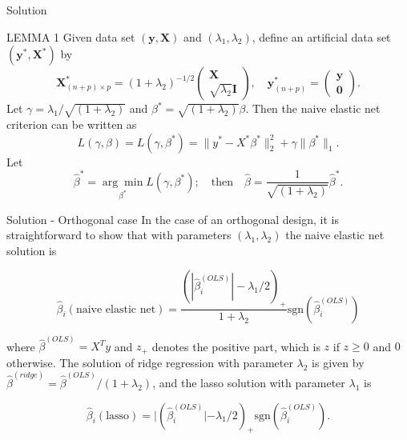     \begin{frame}{Solution}
        \begin{block}{LEMMA 1}
            Given data set $\left(\textbf{y}, \textbf{X}\right)$ and $(\lambda_1, \lambda_2)$, define an artificial data set $\left(\textbf{y}^*, \textbf{X}^*\right)$ by
$$
\mathbf{X}^*_{(n+p) \times p} = (1 + \lambda_2)^{-1/2}
\begin{pmatrix}
\mathbf{X} \\
\sqrt{\lambda_2} \mathbf{I}
\end{pmatrix}, \quad
\mathbf{y}^*_{(n+p)} = \begin{pmatrix}
\mathbf{y} \\
\mathbf{0}
\end{pmatrix}.
$$
Let $\gamma=\lambda_1/\sqrt{(1+\lambda_2)}$ and $\beta^*=\sqrt{(1+\lambda_2)}\beta$. Then the naive elastic net criterion can be written as
$$
L(\gamma, \beta) = L(\gamma, \beta^*) = \lVert y^* - X^* \beta^* \rVert_2^2 + \gamma \lVert \beta^* \rVert_1.
$$
Let
$$
\hat{\beta}^* = \underset{\beta^*}{\arg\min} L\left(\gamma, \beta^*\right); \quad \text{then} \quad \hat{\beta} = \frac{1}{\sqrt{(1 + \lambda_2)}} \hat{\beta}^*.
$$
\end{block}
\end{frame}

\begin{frame}{Solution - Orthogonal case}
    In the case of an orthogonal design, it is straightforward to show that with parameters $(\lambda_1, \lambda_2)$ the naive elastic net solution is

\begin{equation}
  \hat{\beta}_i (\text{naive elastic net}) = \frac{(|\hat{\beta}_i^{(OLS)}| - \lambda_1 / 2)_+}{1 + \lambda_2} \text{sgn}(\hat{\beta}_i^{(OLS)}) 
\end{equation}


where $\hat{\beta}^{(OLS)} = X^T y$ and $z_+$ denotes the positive part, which is $z$ if $z \geq 0$ and $0$ otherwise. The solution of ridge regression with parameter $\lambda_2$ is given by $\hat{\beta}^{(ridge)} = \hat{\beta}^{(OLS)} / (1 + \lambda_2)$, and the lasso solution with parameter $\lambda_1$ is

$$
\hat{\beta}_i (\text{lasso}) = |(\hat{\beta}_i^{(OLS)}| - \lambda_1 / 2)_+ \text{sgn}(\hat{\beta}_i^{(OLS)}).
$$

\end{frame}

